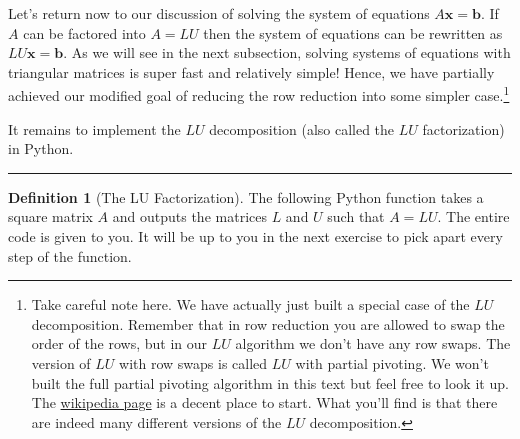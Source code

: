 \documentclass[
]{book}
\theoremstyle{definition}
\newtheorem{definition}{Definition}[chapter]
\theoremstyle{definition}
\theoremstyle{definition}
\theoremstyle{remark}
\begin{document}
Let's return now to our discussion of solving the system of equations \(A \boldsymbol{x} = \boldsymbol{b}\). If \(A\) can be factored into \(A = LU\) then the system of equations can be rewritten as \(LU \boldsymbol{x} = \boldsymbol{b}\). As we will see in the next subsection, solving systems of equations with triangular matrices is super fast and relatively simple! Hence, we have partially achieved our modified goal of reducing the row reduction into some simpler case.\footnote{Take careful note here. We have actually just built a special case of the \(LU\) decomposition. Remember that in row reduction you are allowed to swap the order of the rows, but in our \(LU\) algorithm we don't have any row swaps. The version of \(LU\) with row swaps is called \(LU\) with partial pivoting. We won't built the full partial pivoting algorithm in this text but feel free to look it up. The \href{https://en.wikipedia.org/wiki/LU_decomposition\#LU_factorization_with_partial_pivoting}{wikipedia page} is a decent place to start. What you'll find is that there are indeed many different versions of the \(LU\) decomposition.}

It remains to implement the \(LU\) decomposition (also called the \(LU\) factorization) in Python.

\begin{center}\rule{0.5\linewidth}{0.5pt}\end{center}

\begin{definition}[The LU Factorization]
\protect\hypertarget{def:lu}{}{\label{def:lu} {} }The following Python function takes a square matrix \(A\) and outputs the matrices \(L\) and \(U\) such that \(A = LU\). The entire code is given to you. It will be up to you in the next exercise to pick apart every step of the function.
\end{definition}
\end{document}
